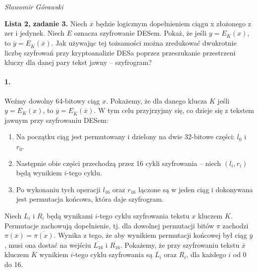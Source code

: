 \documentclass{article}
\renewcommand{\c}{\overline}
\begin{document}
\begin{flushright}
\textit{Sławomir Górawski}
\end{flushright}
\bigskip

\noindent\textbf{Lista 2, zadanie 3.}
Niech $\c{x}$ będzie logicznym dopełnieniem ciągu x złożonego z zer i jedynek.
Niech $E$ oznacza szyfrowanie DESem.
Pokaż, że jeśli $y = E_K(x)$, to $\c y = E_{\c K}(\c x)$.
Jak używając tej tożsamości można zredukować dwukrotnie liczbę szyfrowań
przy kryptoanalizie DESa poprzez przeszukanie przestrzeni
kluczy dla danej pary tekst jawny -- szyfrogram?

\paragraph{1.}
Weźmy dowolny 64-bitowy ciąg $x$.
Pokażemy, że dla danego klucza $K$ jeśli $y = E_K(x)$, to $\c y = E_{\c K}(\c x)$.
W tym celu przyjrzyjmy się, co dzieje się z tekstem jawnym przy szyfrowaniu DESem:
\begin{enumerate}
    \item Na początku ciąg jest permutowany i dzielony na dwie 32-bitowe części: $l_0$ i $r_0$.
    \item Następnie obie części przechodzą przez 16 cykli szyfrowania --
        niech $(l_i, r_i)$ będą wynikiem $i$-tego cyklu.
    \item Po wykonaniu tych operacji $l_{16}$ oraz $r_{16}$ łączone są w jeden ciąg
        i dokonywana jest permutacja końcowa, która daje szyfrogram.
\end{enumerate}

Niech $L_i$ i $R_i$ będą wynikami $i$-tego cyklu szyfrowania tekstu $x$ kluczem $K$.
Permutacje zachowują dopełnienie,
tj. dla dowolnej permutacji bitów $\pi$ zachodzi $\pi(\c x) = \c{\pi(x)}$.
Wynika z tego, że aby wynikiem permutacji końcowej był ciąg $\c y$,
musi ona dostać na wejściu $\c{L_{16}}$ i $\c{R_{16}}$.
Pokażemy, że przy szyfrowaniu tekstu $\c x$ kluczem $\c K$
wynikiem $i$-tego cyklu szyfrowania są $\c{L_i}$ oraz $\c{R_i}$,
dla każdego $i$ od 0 do 16.
\end{document}
